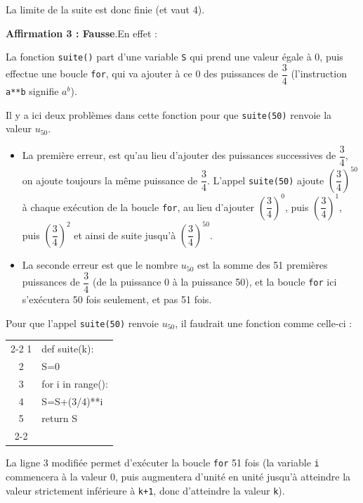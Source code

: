 La limite de la suite est donc finie (et vaut 4).

\medskip

\textbf{Affirmation 3 : Fausse}.\quad En effet :

La fonction \texttt{suite()} part d'une variable \texttt{S} qui prend une valeur égale à 0, puis effectue une boucle \texttt{for}, qui va ajouter à ce 0 des puissances de $\dfrac{3}{4}$ (l'instruction \texttt{a**b} signifie $a^b$).

Il y a ici deux problèmes dans cette fonction pour que \texttt{suite(50)} renvoie la valeur $u_{50}$.

\begin{itemize}[label=$\bullet$]
	\item La première erreur, est qu'au lieu d'ajouter des puissances successives de $\dfrac{3}{4}$, on ajoute toujours la même puissance de $\dfrac{3}{4}$. L'appel \texttt{suite(50)} ajoute $\left(\dfrac{3}{4}\right)^{50}$ à chaque exécution de la boucle \texttt{for}, au lieu d'ajouter $\left(\dfrac{3}{4}\right)^{0}$, puis $\left(\dfrac{3}{4}\right)^{1}$, puis $\left(\dfrac{3}{4}\right)^{2}$ et ainsi de suite jusqu'à $\left(\dfrac{3}{4}\right)^{50}$.
	\item 	La seconde erreur est que le nombre $u_{50}$ est la somme des 51 premières puissances de $\dfrac{3}{4}$ (de la puissance 0 à la puissance 50), et la boucle \texttt{for} ici s'exécutera 50 fois seulement, et pas 51 fois.
	\end{itemize}

	Pour que l'appel \texttt{suite(50)} renvoie $u_{50}$, il faudrait une fonction comme celle-ci :

\begin{center}
\begin{ttfamily}
\begin{tabularx}{8cm}{c|X|}\cline{2-2}
	1&def suite(k):\\
	2&\quad S=0\\
	3&\quad for i in range({\red{k+1}}):\\
	4&\qquad S=S+(3/4)**{\red i}\\
	5&\quad return S\\ \cline{2-2}
\end{tabularx}
\end{ttfamily}
\end{center}

La ligne 3 modifiée permet d'exécuter la boucle \texttt{for} 51 fois (la variable \texttt{i} commencera à la valeur 0, puis augmentera d'unité en unité jusqu'à atteindre la valeur strictement inférieure à \texttt{k+1}, donc d'atteindre la valeur \texttt{k}).


